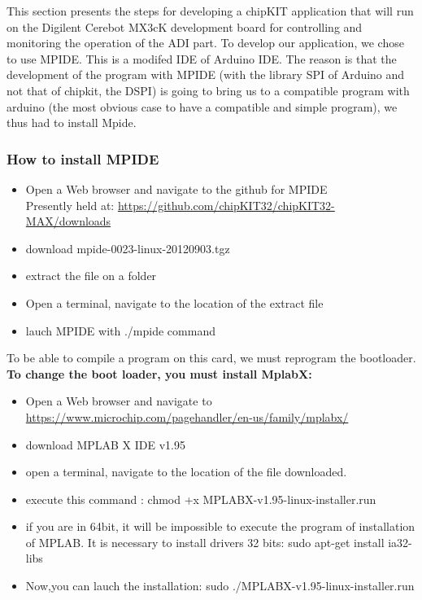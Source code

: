 \documentclass[10pt,a4paper]{report}
\begin{document}
This section presents the steps for developing a chipKIT application that will run on the Digilent Cerebot MX3cK development board for controlling and monitoring the operation of the ADI part.
To develop our application, we chose to use MPIDE. This is a modifed IDE of Arduino IDE. The reason is that the development of the program with MPIDE (with the library SPI of Arduino and not that of chipkit, the DSPI) is going to bring us to a compatible program with arduino (the most obvious case to have a compatible and simple program), we thus had to install Mpide.

\subsubsection*{How to install MPIDE}

\begin{itemize}
\item Open a Web browser and navigate to the github for MPIDE \\ Presently held at: \url{https://github.com/chipKIT32/chipKIT32-MAX/downloads}
\item download mpide-0023-linux-20120903.tgz
\item extract the file on a folder
\item Open a terminal, navigate to the location of the extract file
\item lauch MPIDE with ./mpide command\\
\end{itemize}
To be able to compile a program on this card, we must reprogram the bootloader.\\

\textbf{To change the boot loader, you must install MplabX:\\}
\begin{itemize}
\item Open a Web browser and navigate to \url{https://www.microchip.com/pagehandler/en-us/family/mplabx/}
\item download MPLAB X IDE v1.95
\item open a terminal, navigate to the location of the file downloaded.
\item execute this command : chmod +x MPLABX-v1.95-linux-installer.run
\item if you are in 64bit,  it will be impossible to execute the program of installation of MPLAB. It is necessary to install drivers 32 bits:   sudo apt-get install ia32-libs
\item Now,you can lauch the installation: sudo ./MPLABX-v1.95-linux-installer.run
\end{itemize}
\end{document}
